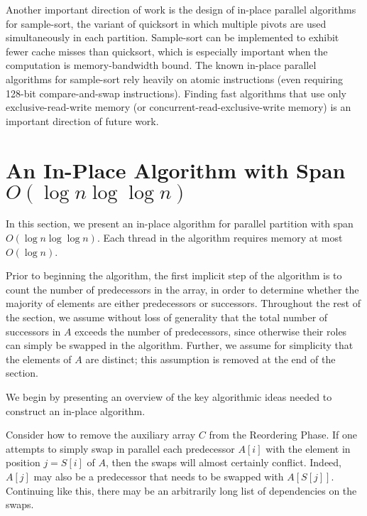 \documentclass[twocolumn,10pt]{article}
\renewcommand{\paragraph}[1]{\vspace{0.09in}\noindent{\bf \boldmath #1.}}
\theoremstyle{remark}
\theoremstyle{remark}
\begin{document}
Another important direction of work is the design of in-place parallel
algorithms for sample-sort, the variant of quicksort in which multiple
pivots are used simultaneously in each partition. Sample-sort can be
implemented to exhibit fewer cache misses than quicksort, which is
especially important when the computation is memory-bandwidth
bound. The known in-place parallel algorithms for sample-sort rely
heavily on atomic instructions \cite{AxtmannWi17} (even requiring
128-bit compare-and-swap instructions). Finding fast algorithms that
use only exclusive-read-write memory (or
concurrent-read-exclusive-write memory) is an important direction of
future work.



\clearpage

\appendix

\section{An In-Place Algorithm with Span $O(\log n \log \log n)$}\label{secalg}

In this section, we present an in-place algorithm for parallel
partition with span $O(\log n \log \log n)$. Each thread in the
algorithm requires memory at most $O(\log n)$.

Prior to beginning the algorithm, the first implicit step of the
algorithm is to count the number of predecessors in the array, in
order to determine whether the majority of elements are either
predecessors or successors. Throughout the rest of the section, we
assume without loss of generality that the total number of successors
in $A$ exceeds the number of predecessors, since otherwise their roles
can simply be swapped in the algorithm. Further, we assume for
simplicity that the elements of $A$ are distinct; this assumption is
removed at the end of the section.


\paragraph{Algorithm Outline}
We begin by presenting an overview of the key algorithmic ideas needed
to construct an in-place algorithm.

Consider how to remove the auxiliary array $C$ from the Reordering
Phase. If one attempts to simply swap in parallel each predecessor
$A[i]$ with the element in position $j = S[i]$ of $A$, then the swaps
will almost certainly conflict. Indeed, $A[j]$ may also be a
predecessor that needs to be swapped with $A[S[j]]$. Continuing like
this, there may be an arbitrarily long list of dependencies on the
swaps.
\end{document}
